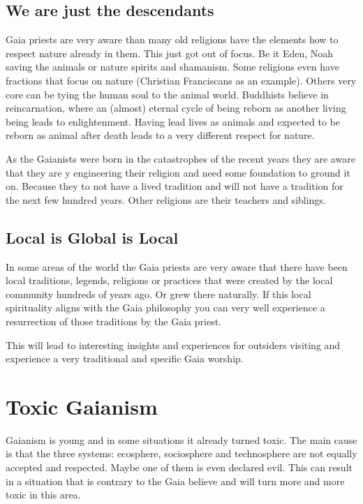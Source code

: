 \subsection{We are just the descendants}

Gaia priests are very aware than many old religions have the elements how to respect nature already in them. This just got out of focus. Be it Eden, Noah saving the animals or nature spirits and shamanism. Some religions even have fractions that focus on nature (Christian Franciscans as an example).
Others very core can be tying the human soul to the animal world. Buddhists believe in reincarnation, where an (almost) eternal cycle of being reborn as another living being leads to enlightenment. Having lead lives as animals and expected to be reborn as animal after death leads to a very different respect for nature.

As the Gaianists were born in the catastrophes of the recent years they are aware that they are y engineering their religion and need some foundation to ground it on. Because they to not have a lived tradition and will not have a tradition for the next few hundred years. Other religions are their teachers and siblings.

\subsection{Local is Global is Local}

In some areas of the world the Gaia priests are very aware that there have been local traditions, legends, religions or practices that were created by the local community hundreds of years ago. Or grew there naturally. If this local spirituality aligns with the Gaia philosophy you can very well experience a resurrection of those traditions by the Gaia priest.

This will lead to interesting insights and experiences for outsiders visiting and experience a very traditional and specific Gaia worship.

\section{Toxic Gaianism}

Gaianism is young and in some situations it already turned toxic. The main cause is that the three systems: ecosphere, sociosphere and technosphere are not equally accepted and respected. Maybe one of them is even declared evil. This can result in a situation that is contrary to the Gaia believe and will turn more and more toxic in this area.

